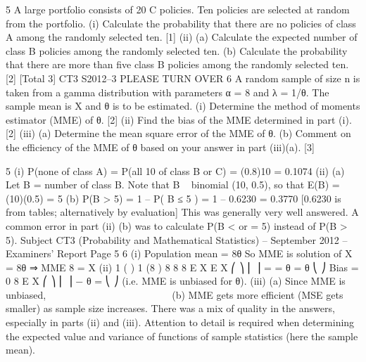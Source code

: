 5 A large portfolio consists of 20%
C policies. Ten policies are selected at random from the portfolio.
(i) Calculate the probability that there are no policies of class A among the
randomly selected ten. [1]
(ii) (a) Calculate the expected number of class B policies among the randomly
selected ten.
(b) Calculate the probability that there are more than five class B policies
among the randomly selected ten.
[2]
[Total 3]
CT3 S2012–3 PLEASE TURN OVER
6 A random sample of size n is taken from a gamma distribution with parameters α = 8
and λ = 1/θ. The sample mean is X and θ is to be estimated.
(i) Determine the method of moments estimator (MME) of θ. [2]
(ii) Find the bias of the MME determined in part (i). [2]
(iii) (a) Determine the mean square error of the MME of θ.
(b) Comment on the efficiency of the MME of θ based on your answer in
part (iii)(a).
[3]


5 (i) P(none of class A) = P(all 10 of class B or C) = (0.8)10 = 0.1074
(ii) (a) Let B = number of class B.
Note that B ~ binomial (10, 0.5), so that E(B) = (10)(0.5) = 5
(b) P(B > 5) = 1 – P( B ≤ 5 ) = 1 – 0.6230 = 0.3770
[0.6230 is from tables; alternatively by evaluation]
This was generally very well answered. A common error in part (ii) (b) was to calculate
P(B < or = 5) instead of P(B > 5).
Subject CT3 (Probability and Mathematical Statistics) – September 2012 – Examiners’ Report
Page 5
6 (i) Population mean = 8θ
So MME is solution of X = 8θ ⇒ MME
8
= X
(ii) 1 ( ) 1 (8 )
8 8 8
E X E X
⎛ ⎞
⎜ ⎟ = = θ = θ
⎝ ⎠
Bias = 0
8
E X
⎛ ⎞
⎜ ⎟ − θ =
  ⎝ ⎠
(i.e. MME is unbiased for θ).
(iii) (a) Since MME is unbiased, 􀜯􀜵􀜧 􁉀􀯑􀴤
􀬼􁉁 􀵌 􀝒􀜽􀝎 􁉀􀯑􀴤
􀬼􁉁 􀵌 􀬼􀰏􀰮
􀬺􀬸􀯡 􀵌 􀰏􀰮
􀬼􀯡
(b) MME gets more efficient (MSE gets smaller) as sample size increases.
There was a mix of quality in the answers, especially in parts (ii) and (iii). Attention to detail
is required when determining the expected value and variance of functions of sample
statistics (here the sample mean).
